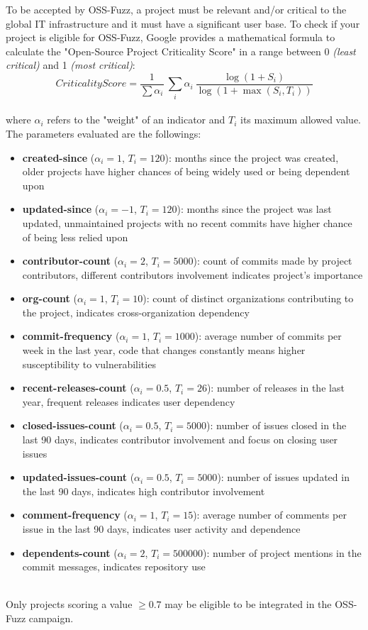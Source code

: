 To be accepted by OSS-Fuzz, a project must be relevant and/or critical to the global IT infrastructure and it must have a significant user base.
To check if your project is eligible for OSS-Fuzz, Google provides a mathematical formula to calculate the "Open-Source Project Criticality Score" \cite{score} in a range between 0 \textit{(least critical)} and 1 \textit{(most critical)}:
\ \\ 

\begin{equation}
    CriticalityScore = \frac{1}{\sum \alpha_i}\  \sum_i \alpha_i \ \frac{\log(1+S_i)}{\log(1+\max(S_i,T_i))}
\end{equation}
\ \\ 

where $\alpha_i$ refers to the "weight" of an indicator and $T_i$ its maximum allowed value.
The parameters evaluated are the followings:
\begin{itemize}
    \item \textbf{created-since} ($\alpha_i = 1$, $T_i = 120$): months since the project was created, older projects have higher chances of being widely used or being dependent upon
    \item \textbf{updated-since} ($\alpha_i = -1$, $T_i = 120$): months since the project was last updated, unmaintained projects with no recent commits have higher chance of being less relied upon
    \item \textbf{contributor-count} ($\alpha_i = 2$, $T_i = 5000$): count of commits made by project contributors, different contributors involvement indicates project's importance
    \item \textbf{org-count} ($\alpha_i = 1$, $T_i = 10$): count of distinct organizations contributing to the project, indicates cross-organization dependency
    \item \textbf{commit-frequency} ($\alpha_i = 1$, $T_i = 1000$): average number of commits per week in the last year, code that changes constantly means higher susceptibility to vulnerabilities
    \item \textbf{recent-releases-count} ($\alpha_i = 0.5$, $T_i = 26$): number of releases in the last year, frequent releases indicates user dependency
    \item \textbf{closed-issues-count} ($\alpha_i = 0.5$, $T_i = 5000$): number of issues closed in the last 90 days, indicates contributor involvement and focus on closing user issues
    \item \textbf{updated-issues-count} ($\alpha_i = 0.5$, $T_i = 5000$): number of issues updated in the last 90 days, indicates high contributor involvement
    \item \textbf{comment-frequency} ($\alpha_i = 1$, $T_i = 15$): average number of comments per issue in the last 90 days, indicates  user activity and dependence
    \item \textbf{dependents-count} ($\alpha_i = 2$, $T_i = 500000$): number of project mentions in the commit messages, indicates repository use
\end{itemize}
\ \\
Only projects scoring a value $\geq 0.7$ may be eligible to be integrated in the OSS-Fuzz campaign.



